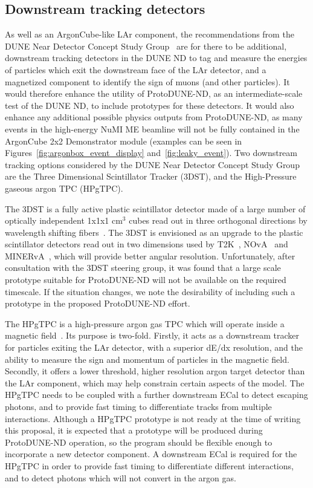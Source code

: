 \subsection{Downstream tracking detectors}
\label{sec:tracking_detectors}
As well as an ArgonCube-like LAr component, the recommendations from the DUNE Near Detector Concept Study Group~\cite{dune_ndcsg} are for there to be additional, downstream tracking detectors in the DUNE ND to tag and measure the energies of particles which exit the downstream face of the LAr detector, and a magnetized component to identify the sign of muons (and other particles). It would therefore enhance the utility of ProtoDUNE-ND, as an intermediate-scale test of the DUNE ND, to include prototypes for these detectors. It would also enhance any additional possible physics outputs from ProtoDUNE-ND, as many events in the high-energy NuMI ME beamline will not be fully contained in the ArgonCube 2x2 Demonstrator module (examples can be seen in Figures~\ref{fig:argonbox_event_display} and~\ref{fig:leaky_event}). Two downstream tracking options considered  by the DUNE Near Detector Concept Study Group are the Three Dimensional Scintillator Tracker (3DST), and the High-Pressure gaseous argon TPC (HPgTPC).

The 3DST is a fully active plastic scintillator detector made of a large number of optically independent 1x1x1 cm$^{3}$ cubes read out in three orthogonal directions by wavelength shifting fibers~\cite{3dst}. The 3DST is envisioned as an upgrade to the plastic scintillator detectors read out in two dimensions used by T2K~\cite{t2k-fgd,t2k-ingrid}, NOvA~\cite{nova} and MINERvA~\cite{minerva-nim}, which will provide better angular resolution. Unfortunately, after consultation with the 3DST steering group, it was found that a large scale prototype suitable for ProtoDUNE-ND will not be available on the required timescale. If the situation changes, we note the desirability of including such a prototype in the proposed ProtoDUNE-ND effort.

The HPgTPC is a high-pressure argon gas TPC which will operate inside a magnetic field~\cite{dune_ndcsg}. Its purpose is two-fold. Firstly, it acts as a downstream tracker for particles exiting the LAr detector, with a superior dE/dx resolution, and the ability to measure the sign and momentum of particles in the magnetic field. Secondly, it offers a lower threshold, higher resolution argon target detector than the LAr component, which may help constrain certain aspects of the model. The HPgTPC needs to be coupled with a further downstream ECal to detect escaping photons, and to provide fast timing to differentiate tracks from multiple interactions. Although a HPgTPC prototype is not ready at the time of writing this proposal, it is expected that a prototype will be produced during ProtoDUNE-ND operation, so the program should be flexible enough to incorporate a new detector component. A downstream ECal is required for the HPgTPC in order to provide fast timing to differentiate different interactions, and to detect photons which will not convert in the argon gas.

